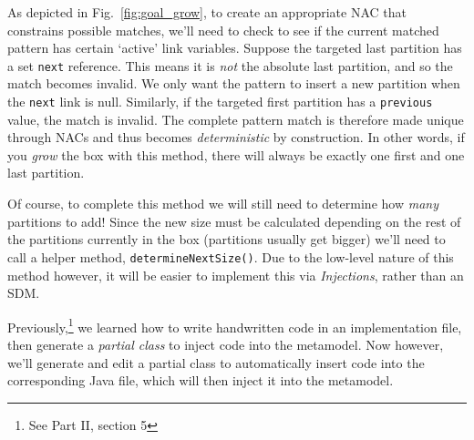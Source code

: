 As depicted in Fig.~\ref{fig:goal_grow}, to create an appropriate \mbox{NAC} that constrains possible matches, we'll need to check to see if the current matched
pattern has certain `active' link variables. Suppose the targeted last partition has a set \texttt{next} reference. This means it is \emph{not} the absolute
last partition, and so the match becomes invalid. We only want the pattern to insert a new partition when the \texttt{next} link is null. Similarly, if the
targeted first partition has a \texttt{previous} value, the match is invalid. The complete pattern match is therefore made unique through NACs and thus becomes
\emph{deterministic} by construction. In other words, if you \emph{grow} the box with this method, there will always be exactly one first and one last
partition.

Of course, to complete this method we will still need to determine how \emph{many} partitions to add! Since the new size must be calculated depending on the
rest of the partitions currently in the box (partitions usually get bigger) we'll need to call a helper method, \texttt{determineNextSize()}. Due to the
low-level nature of this method however, it will be easier to implement this via \emph{Injections}, rather than an SDM.


Previously,\footnote{See Part II, section 5} we learned how to write handwritten code in an implementation file, then generate
a \emph{partial class} to inject code into the metamodel. Now however, we'll generate and edit a partial class to automatically insert code into the
corresponding Java file, which will then inject it into the metamodel.

